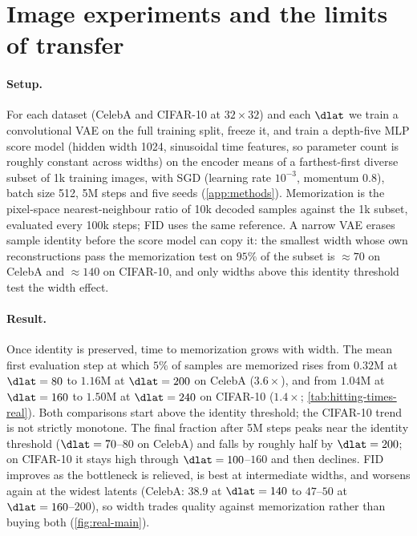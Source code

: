 \section{Image experiments and the limits of transfer}
\label{sec:real}\label{sec:real-data}\label{sec:spectral-predictor}

\paragraph{Setup.}
For each dataset (CelebA and CIFAR-10 at $32\times32$) and each $\dlat$ we train a convolutional VAE on the full training split, freeze it, and train a depth-five MLP score model (hidden width 1024, sinusoidal time features, so parameter count is roughly constant across widths) on the encoder means of a farthest-first diverse subset of 1k training images, with SGD (learning rate $10^{-3}$, momentum $0.8$), batch size 512, 5M steps and five seeds (\cref{app:methods}). Memorization is the pixel-space nearest-neighbour ratio of 10k decoded samples against the 1k subset, evaluated every 100k steps; FID uses the same reference. A narrow VAE erases sample identity before the score model can copy it: the smallest width whose own reconstructions pass the memorization test on $95\%$ of the subset is $\approx70$ on CelebA and $\approx140$ on CIFAR-10, and only widths above this identity threshold test the width effect.

\paragraph{Result.}
Once identity is preserved, time to memorization grows with width. The mean first evaluation step at which $5\%$ of samples are memorized rises from $0.32$M at $\dlat=80$ to $1.16$M at $\dlat=200$ on CelebA ($3.6\times$), and from $1.04$M at $\dlat=160$ to $1.50$M at $\dlat=240$ on CIFAR-10 ($1.4\times$; \cref{tab:hitting-times-real}). Both comparisons start above the identity threshold; the CIFAR-10 trend is not strictly monotone. The final fraction after 5M steps peaks near the identity threshold ($\dlat=70$--$80$ on CelebA) and falls by roughly half by $\dlat=200$; on CIFAR-10 it stays high through $\dlat=100$--$160$ and then declines. FID improves as the bottleneck is relieved, is best at intermediate widths, and worsens again at the widest latents (CelebA: $38.9$ at $\dlat=140$ to $47$--$50$ at $\dlat=160$--$200$), so width trades quality against memorization rather than buying both (\cref{fig:real-main}).


